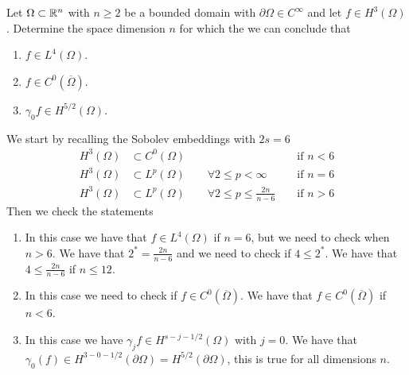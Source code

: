\newpage
\begin{exercise}
    Let \(\Omega \subset \mathbb{R}^n\) with \(n \geq 2\) be a bounded domain with \(\partial \Omega \in C^\infty\) and let \(f \in H^3(\Omega)\). Determine the space dimension \(n\) for which the we can conclude that
    \begin{enumerate}
        \item \(f \in L^4(\Omega)\).
        \item \(f \in C^0(\overline{\Omega})\).
        \item \(\gamma_0 f \in H^{5/2}(\Omega)\).
    \end{enumerate}
\end{exercise}
We start by recalling the Sobolev embeddings with \(2s = 6\)
\begin{align*}
    H^3(\Omega) &\subset C^0(\Omega) && \text{ if } n < 6 \\
    H^3(\Omega) &\subset L^p(\Omega) \qquad \forall 2 \leq p < \infty && \text{ if } n = 6 \\
    H^3(\Omega) &\subset L^p(\Omega) \qquad \forall 2 \leq p \leq \frac{2n}{n - 6} && \text{ if } n > 6
\end{align*}
Then we check the statements
\begin{enumerate}
    \item In this case we have that \(f \in L^4(\Omega)\) if \(n = 6\), but we need to check when \(n > 6\). We have that \(2^* = \frac{2n}{n - 6}\) and we need to check if \(4 \leq 2^*\). We have that \(4 \leq \frac{2n}{n - 6}\) if \(n \leq 12\). 
    \item In this case we need to check if \(f \in C^0(\overline{\Omega})\). We have that \(f \in C^0(\overline{\Omega})\) if \(n < 6\). 
    \item In this case we have \(\gamma_j f \in H^{s-j-1/2}(\Omega)\) with \(j = 0\). We have that \(\gamma_0(f) \in H^{3 - 0 - 1/2}(\partial\Omega) = H^{5/2}(\partial\Omega)\), this is true for all dimensions \(n\).
\end{enumerate}


\newpage

